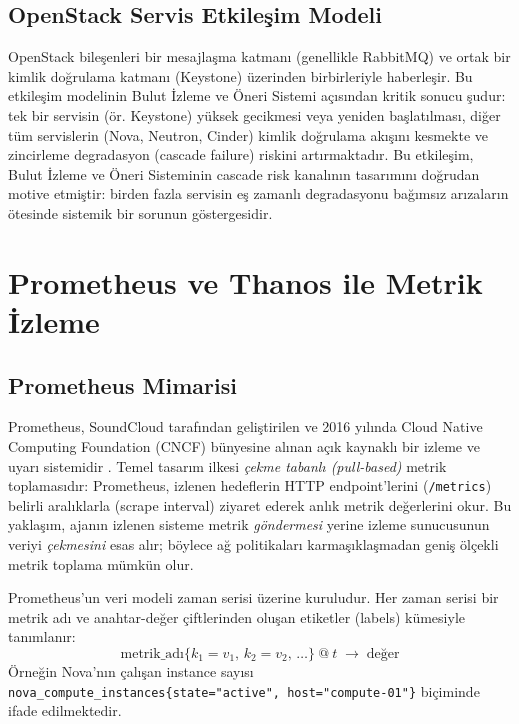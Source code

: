 \subsection{OpenStack Servis Etkileşim Modeli}

OpenStack bileşenleri bir mesajlaşma katmanı (genellikle RabbitMQ) ve ortak bir kimlik doğrulama katmanı (Keystone) üzerinden birbirleriyle haberleşir.
Bu etkileşim modelinin Bulut İzleme ve Öneri Sistemi açısından kritik sonucu şudur: tek bir servisin (ör. Keystone) yüksek gecikmesi veya yeniden başlatılması, diğer tüm servislerin (Nova, Neutron, Cinder) kimlik doğrulama akışını kesmekte ve zincirleme degradasyon (cascade failure) riskini artırmaktadır.
Bu etkileşim, Bulut İzleme ve Öneri Sisteminin cascade risk kanalının tasarımını doğrudan motive etmiştir: birden fazla servisin eş zamanlı degradasyonu bağımsız arızaların ötesinde sistemik bir sorunun göstergesidir.


\section{Prometheus ve Thanos ile Metrik İzleme}
\label{sec:prometheus}

\subsection{Prometheus Mimarisi}

Prometheus, SoundCloud tarafından geliştirilen ve 2016 yılında Cloud Native Computing Foundation (CNCF) bünyesine alınan açık kaynaklı bir izleme ve uyarı sistemidir \autocite{prometheus2024}.
Temel tasarım ilkesi \textit{çekme tabanlı (pull-based)} metrik toplamasıdır: Prometheus, izlenen hedeflerin HTTP endpoint'lerini (\texttt{/metrics}) belirli aralıklarla (scrape interval) ziyaret ederek anlık metrik değerlerini okur.
Bu yaklaşım, ajanın izlenen sisteme metrik \textit{göndermesi} yerine izleme sunucusunun veriyi \textit{çekmesini} esas alır; böylece ağ politikaları karmaşıklaşmadan geniş ölçekli metrik toplama mümkün olur.

Prometheus'un veri modeli zaman serisi üzerine kuruludur.
Her zaman serisi bir metrik adı ve anahtar-değer çiftlerinden oluşan etiketler (labels) kümesiyle tanımlanır:
\begin{equation}
    \text{metrik\_adı}\{k_1{=}v_1,\, k_2{=}v_2,\, \ldots\}\ @\ t \;\to\; \text{değer}
    \label{eq:prom-tseries}
\end{equation}
Örneğin Nova'nın çalışan instance sayısı \texttt{nova\_compute\_instances\{state="active", host="compute-01"\}} biçiminde ifade edilmektedir.

